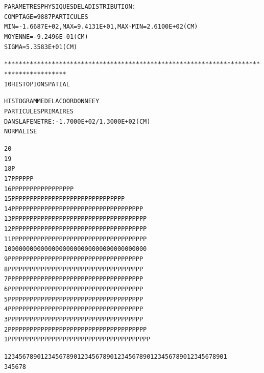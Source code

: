 \begin{alltt}
                PARAMETRES  PHYSIQUES  DE  LA  DISTRIBUTION :
                         COMPTAGE =   9887  PARTICULES
                         MIN = -1.6687E+02, MAX = 9.4131E+01, MAX-MIN = 2.6100E+02(CM) 
                         MOYENNE = -9.2496E-01 (CM) 
                         SIGMA =  5.3583E+01 (CM) 

***************************************************************************************
     10  HISTO     PION      SPATIAL 

                         HISTOGRAMME  DE  LA  COORDONNEE  Y    
                         PARTICULES  PRIMAIRES                 
                         DANS  LA  FENETRE :  -1.7000E+02 /   1.3000E+02 (CM) 
                         NORMALISE     

   20                                                                            
   19                                                                            
   18                                              P                             
   17                                        P     PP        P  P      P              
   16                                        PP    PP PPP  P PP P P  PPPPP            
   15                                      P PPPPP PPPPPPPPPPPPPPPPPPPPPPP PP         
   14                                    PPPPPPPPP PPPPPPPPPPPPPPPPPPPPPPPPPPP        
   13                                    PPPPPPPPPPPPPPPPPPPPPPPPPPPPPPPPPPPPP        
   12                                    PPPPPPPPPPPPPPPPPPPPPPPPPPPPPPPPPPPPP        
   11                                    PPPPPPPPPPPPPPPPPPPPPPPPPPPPPPPPPPPPP        
   10                                    0000000000000000000000000000000000000        
    9                                    PPPPPPPPPPPPPPPPPPPPPPPPPPPPPPPPPPPPP        
    8                                    PPPPPPPPPPPPPPPPPPPPPPPPPPPPPPPPPPPPP        
    7                                    PPPPPPPPPPPPPPPPPPPPPPPPPPPPPPPPPPPPP        
    6                                    PPPPPPPPPPPPPPPPPPPPPPPPPPPPPPPPPPPPP        
    5                                    PPPPPPPPPPPPPPPPPPPPPPPPPPPPPPPPPPPPP        
    4                                    PPPPPPPPPPPPPPPPPPPPPPPPPPPPPPPPPPPPP        
    3                                    PPPPPPPPPPPPPPPPPPPPPPPPPPPPPPPPPPPPP        
    2                                   PPPPPPPPPPPPPPPPPPPPPPPPPPPPPPPPPPPPPP        
    1                                   PPPPPPPPPPPPPPPPPPPPPPPPPPPPPPPPPPPPPPP       

                         1234567890123456789012345678901234567890123456789012345678901
                                  3         4         5         6         7         8



\end{alltt}
